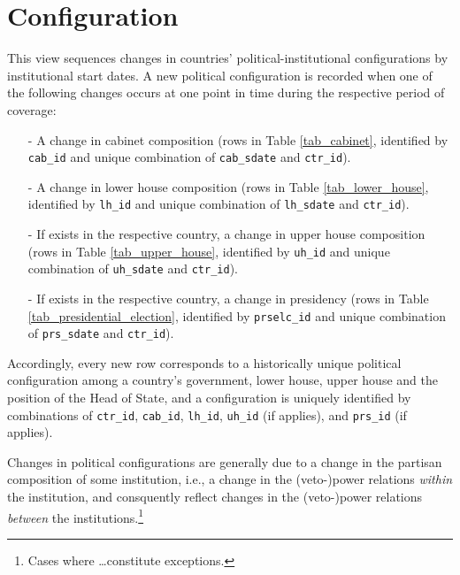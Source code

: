 \section{Configuration}\label{sec_view_configuration}
This view sequences changes in countries' political-institutional configurations by institutional start dates.
A new political configuration is recorded when one of the following changes occurs at one point in time during the respective period of coverage:
\begin{itemize}\itemsep-4pt 
\item[-]{A change in cabinet composition (rows in Table \ref{tab_cabinet}, identified by \texttt{\footnotesize cab\_id} and unique combination of \texttt{\footnotesize cab\_sdate} and \texttt{\footnotesize ctr\_id}).}
\item[-]{A change in lower house composition (rows in Table \ref{tab_lower_house}, identified by  \texttt{\footnotesize lh\_id} and unique combination of \texttt{\footnotesize lh\_sdate} and \texttt{\footnotesize ctr\_id}).}
\item[-]{If exists in the respective country, a change in upper house composition (rows in Table \ref{tab_upper_house}, identified by \texttt{\footnotesize uh\_id} and unique combination of \texttt{\footnotesize uh\_sdate} and \texttt{\footnotesize ctr\_id}).}
\item[-]{If exists in the respective country, a change in presidency (rows in Table \ref{tab_presidential_election}, identified by \texttt{\footnotesize prselc\_id} and unique combination of \texttt{\footnotesize prs\_sdate} and \texttt{\footnotesize ctr\_id}).}
\end{itemize}

Accordingly, every new row corresponds to a historically unique political configuration among a country's government, lower house, upper house and the position of the Head of State, and a configuration is uniquely identified by combinations of \texttt{\footnotesize ctr\_id}, \texttt{\footnotesize cab\_id}, \texttt{\footnotesize lh\_id}, \texttt{\footnotesize uh\_id} (if applies), and \texttt{\footnotesize prs\_id} (if applies).

Changes in political configurations are generally due to a change in the partisan composition of some institution, i.e., a change in the (veto-)power relations \emph{within} the institution, and consquently reflect changes in the (veto-)power relations \emph{between} the institutions.\footnote{Cases where \ldots constitute exceptions.}

